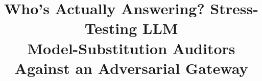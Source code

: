 \documentclass[conference]{IEEEtran}
\newif\ifanonymous
\begin{document}
\title{Who's Actually Answering? Stress-Testing LLM\\Model-Substitution Auditors Against an Adversarial Gateway}

\ifanonymous
\author{\IEEEauthorblockN{Anonymous Author(s)}
\IEEEauthorblockA{Submitted for double-blind review}}
\else
\author{
}
\fi

\maketitle










\clearpage


\end{document}
